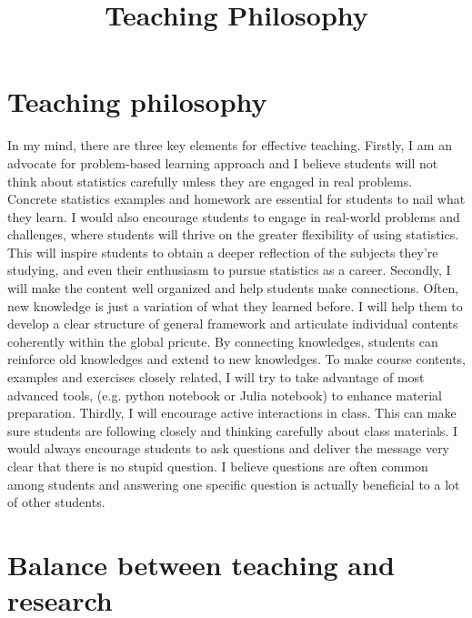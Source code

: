 \documentclass[12pt]{amsart} \usepackage{amssymb}
\title[]{Teaching Philosophy}
\begin{document}
\maketitle
\thispagestyle{empty}
\section{Teaching philosophy}

In my mind, there are three key elements for effective teaching.
Firstly, I am an advocate for problem-based learning approach and 
I believe students will not think about statistics carefully unless they are engaged in real problems.
Concrete statistics examples and homework are essential for students to nail what they learn.
I would also encourage students to engage in real-world problems and challenges,
where students will thrive on the greater flexibility of using statistics.
This will inspire students to obtain a deeper reflection of the subjects they're studying,
and even their enthusiasm to pursue statistics as a career. 
Secondly, I will make the content well organized and help students make connections.
Often, new knowledge is just a variation of what they learned before.
I will help them to develop a clear structure of general framework and 
articulate  individual contents coherently within the global pricute.
By connecting knowledges,
students can reinforce old knowledges and extend to new knowledges.
To make course contents, examples and exercises closely related,
I will try to take advantage of most advanced tools, (e.g. python notebook or Julia notebook) to enhance material preparation.
Thirdly, I will encourage active interactions in class.
This can make sure students are following closely and thinking carefully about class materials.
I would always encourage students to ask questions and deliver the message very clear that there is no stupid question. 
I believe questions are often common among students and
answering one specific question is actually beneficial to a lot of other students.

\section{Balance between teaching and research}
\end{document}
